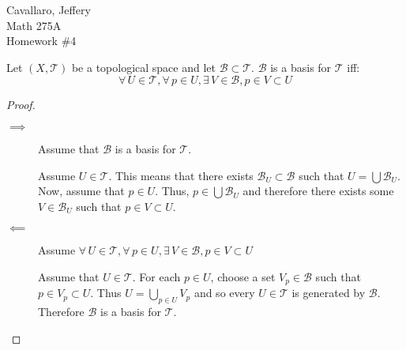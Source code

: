 \documentclass[letterpaper,12pt,fleqn]{article}
\newcommand{\T}{\mathscr{T}}
\newcommand{\B}{\mathcal{B}}
\begin{document}
Cavallaro, Jeffery \\
Math 275A \\
Homework \#4

\bigskip

\begin{theorem}[3.1]
  Let \((X,\T)\) be a topological space and let \(\B\subset\T\).  \(\B\) is a basis for \(\T\) iff:
  \[\forall\,U\in\T,\forall\,p\in U,\exists\,V\in\B,p\in V\subset U\]
\end{theorem}

\begin{proof}
  \begin{description}
  \item[]
  \item[\(\implies\)] Assume that \(\B\) is a basis for \(\T\).

    Assume \(U\in\T\).  This means that there exists \(\B_U\subset\B\) such that \(U=\bigcup\B_U\).  Now, assume
    that \(p\in U\).  Thus, \(p\in\bigcup\B_U\) and therefore there exists some \(V\in\B_U\) such that
    \(p\in V\subset U\).

  \item[\(\impliedby\)] Assume \(\forall\,U\in\T,\forall\,p\in U,\exists\,V\in\B,p\in V\subset U\)

    Assume that \(U\in\T\).  For each \(p\in U\), choose a set \(V_p\in\B\) such that \(p\in V_p\subset U\).  Thus
    \(U=\bigcup_{p\in U}V_p\) and so every \(U\in\T\) is generated by \(\B\).  Therefore \(\B\) is a basis for
    \(\T\).
  \end{description}
\end{proof}
\end{document}

